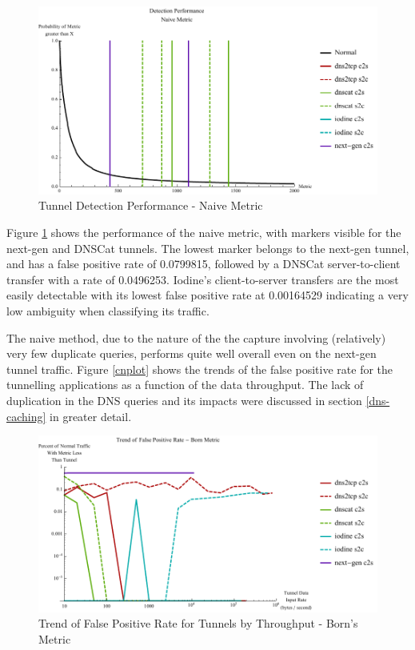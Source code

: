 \documentclass[12pt]{report}
\theoremstyle{remark}
\theoremstyle{definition}
\theoremstyle{definition}
\theoremstyle{definition}
\begin{document}
\begin{figure}
\centering
\includegraphics[width=\textwidth]{../figures/mpnv.pdf}
\caption[Tunnel Detection Performance - Naive Metric]{Tunnel Detection 
Performance - Naive Metric}
\label{mpnv}
\end{figure}

Figure \ref{mpnv} shows the performance of the naive metric, with markers
visible for the next-gen and DNSCat tunnels. The lowest marker belongs to the
next-gen tunnel, and has a false positive rate of 0.0799815, followed by a
DNSCat server-to-client transfer with a rate of 0.0496253. Iodine's
client-to-server transfers are the most easily detectable with its lowest false
positive rate at 0.00164529 indicating a very low ambiguity when classifying its
traffic.

The naive method, due to the nature of the the capture involving (relatively)
very few duplicate queries, performs quite well overall even on the next-gen
tunnel traffic. Figure \ref{cnplot} shows the trends of the false positive rate
for the tunnelling applications as a function of the data throughput. The lack
of duplication in the DNS queries and its impacts were discussed in section
\ref{dns-caching} in greater detail.

\begin{figure}
\centering
\includegraphics[width=\textwidth]{../figures/cbplot.pdf}
\caption[Trend of False Positive Rate for Tunnels by Throughput - Born's 
Metric]{Trend of False Positive Rate for Tunnels by Throughput - Born's Metric}
\label{cbplot}
\end{figure}
\end{document}
